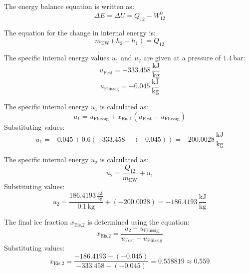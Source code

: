 The energy balance equation is written as:  
\[
\Delta E = \Delta U = Q_{12} - W_{12}^0
\]  

The equation for the change in internal energy is:  
\[
m_{\text{EW}} (h_2 - h_1) = Q_{12}
\]  

The specific internal energy values \( u_1 \) and \( u_2 \) are given at a pressure of \( 1.4 \, \text{bar} \):  
\[
u_{\text{Fest}} = -333.458 \, \frac{\text{kJ}}{\text{kg}}
\]  
\[
u_{\text{Flüssig}} = -0.045 \, \frac{\text{kJ}}{\text{kg}}
\]  

The specific internal energy \( u_1 \) is calculated as:  
\[
u_1 = u_{\text{Flüssig}} + x_{\text{Eis,1}} (u_{\text{Fest}} - u_{\text{Flüssig}})
\]  
Substituting values:  
\[
u_1 = -0.045 + 0.6 (-333.458 - (-0.045)) = -200.0028 \, \frac{\text{kJ}}{\text{kg}}
\]  

The specific internal energy \( u_2 \) is calculated as:  
\[
u_2 = \frac{Q_{12}}{m_{\text{EW}}} + u_1
\]  
Substituting values:  
\[
u_2 = \frac{186.4193 \, \frac{\text{kJ}}{\text{kg}}}{0.1 \, \text{kg}} + (-200.0028) = -186.4193 \, \frac{\text{kJ}}{\text{kg}}
\]  

The final ice fraction \( x_{\text{Eis,2}} \) is determined using the equation:  
\[
x_{\text{Eis,2}} = \frac{u_2 - u_{\text{Flüssig}}}{u_{\text{Fest}} - u_{\text{Flüssig}}}
\]  
Substituting values:  
\[
x_{\text{Eis,2}} = \frac{-186.4193 - (-0.045)}{-333.458 - (-0.045)} = 0.558819 \approx 0.559
\]